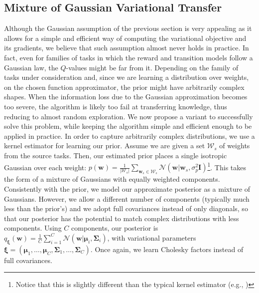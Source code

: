 \documentclass{article}
\newcommand{\abs}[1]{\left\lvert #1 \right\rvert}
\begin{document}
\subsection{Mixture of Gaussian Variational Transfer}\label{sec:mgvt}

Although the Gaussian assumption of the previous section is very appealing as it allows for a simple and efficient way of computing the variational objective and its gradients, we believe that such assumption almost never holds in practice. In fact, even for families of tasks in which the reward and transition models follow a Gaussian law, the $Q$-values might be far from it. Depending on the family of tasks under consideration and, since we are learning a distribution over weights, on the chosen function approximator, the prior might have arbitrarily complex shapes. When the information loss due to the Gaussian approximation becomes too severe, the algorithm is likely too fail at transferring knowledge, thus reducing to almost random exploration. We now propose a variant to successfully solve this problem, while keeping the algorithm simple and efficient enough to be applied in practice. In order to capture arbitrarily complex distributions, we use a kernel estimator \cite{}\todo{} for learning our prior. Assume we are given a set $\mathcal{W}_s$ of weights from the source tasks. Then, our estimated prior places a single isotropic Gaussian over each weight: $p(\bm{w}) = \frac{1}{\abs{\mathcal{W}_s}}\sum_{\bm{w}_s \in \mathcal{W}_s}\mathcal{N}(\bm{w}|\bm{w}_s,\sigma_p^2\bm{I})$\footnote{Notice that this is slightly different than the typical kernel estimator (e.g., \cite{})}. This takes the form of a mixture of Gaussians with equally weighted components. Consistently with the prior, we model our approximate posterior as a mixture of Gaussians. However, we allow a different number of components (typically much less than the prior's) and we adopt full covariances instead of only diagonals, so that our posterior has the potential to match complex distributions with less components. Using $C$ components, our posterior is $q_{\bm{\xi}}(\bm{w}) = \frac{1}{C}\sum_{i=1}^C\mathcal{N}(\bm{w}|\bm{\mu}_i,\bm{\Sigma}_i)$, with variational parameters $\bm{\xi} = (\bm{\mu}_1,\dots,\bm{\mu}_C,\bm{\Sigma}_1,\dots,\bm{\Sigma}_C)$. Once again, we learn Cholesky factors instead of full covariances.
\end{document}
